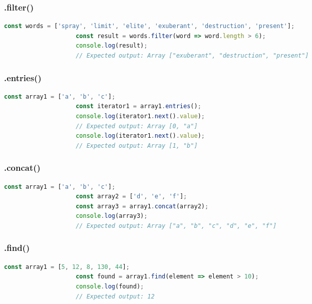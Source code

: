 \documentclass[a4paper, landscape, 8pt]{scrartcl}
\begin{document}
\begin{multicols*}{4}
        \subsubsection{.filter()}
        \begin{lstlisting}[language=JavaScript]
                    const words = ['spray', 'limit', 'elite', 'exuberant', 'destruction', 'present'];
                    const result = words.filter(word => word.length > 6);
                    console.log(result);
                    // Expected output: Array ["exuberant", "destruction", "present"]
        \end{lstlisting}

        \subsubsection{.entries()}
        \begin{lstlisting}[language=JavaScript]
                    const array1 = ['a', 'b', 'c'];
                    const iterator1 = array1.entries();
                    console.log(iterator1.next().value);
                    // Expected output: Array [0, "a"]
                    console.log(iterator1.next().value);
                    // Expected output: Array [1, "b"]
        \end{lstlisting}

        \subsubsection{.concat()}
        \begin{lstlisting}[language=JavaScript]
                    const array1 = ['a', 'b', 'c'];
                    const array2 = ['d', 'e', 'f'];
                    const array3 = array1.concat(array2);
                    console.log(array3);
                    // Expected output: Array ["a", "b", "c", "d", "e", "f"]
        \end{lstlisting}

        \subsubsection{.find()}
        \begin{lstlisting}[language=JavaScript]
                    const array1 = [5, 12, 8, 130, 44];
                    const found = array1.find(element => element > 10);
                    console.log(found);
                    // Expected output: 12
        \end{lstlisting}


\end{multicols*}
\end{document}
